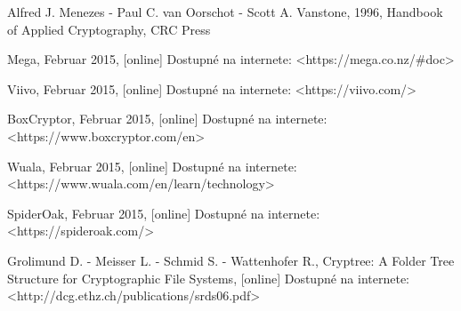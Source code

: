 \documentclass[12pt, oneside]{book}
\begin{document}
\newpage	

\backmatter

\thispagestyle{empty}
\nocite{*}
\clearpage


 

\begin{thebibliography}{1}

 Alfred J. Menezes - Paul C. van Oorschot - Scott A. Vanstone, 1996, Handbook of Applied Cryptography, CRC Press

 Mega, Februar 2015,  [online] Dostupné na internete: <https://mega.co.nz/\#doc>

 Viivo, Februar 2015,  [online] Dostupné na internete: <https://viivo.com/>

 BoxCryptor, Februar 2015,  [online] Dostupné na internete: <https://www.boxcryptor.com/en>

 Wuala, Februar 2015,  [online] Dostupné na internete: <https://www.wuala.com/en/learn/technology>

 SpiderOak, Februar 2015,  [online] Dostupné na internete: <https://spideroak.com/>

 Grolimund D. - Meisser L. - Schmid S. - Wattenhofer R., Cryptree: A Folder Tree Structure for Cryptographic File Systems, [online] Dostupné na internete: <http://dcg.ethz.ch/publications/srds06.pdf>
 





\end{thebibliography}



%
%
%
%
\end{document}
